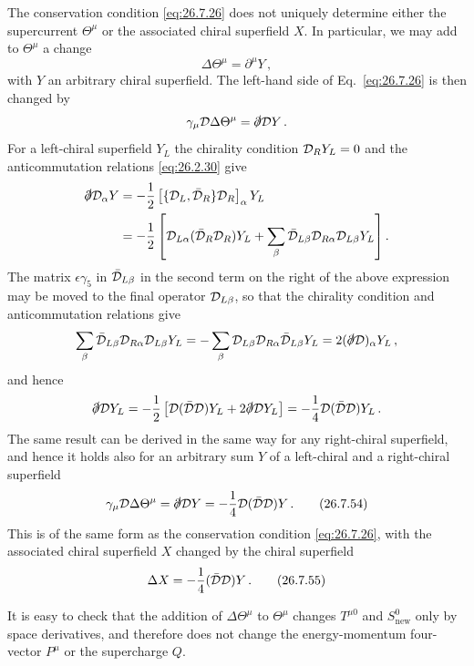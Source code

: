 The conservation condition \eqref{eq:26.7.26} does not uniquely determine
either the supercurrent \(\Theta^\mu\) or the associated chiral superfield
\(X\). In particular, we may add to \(\Theta^\mu\) a change
\begin{equation}
  \Delta\Theta^\mu=\partial^\mu Y\,,
  \tag{26.7.53}\label{eq:26.7.53}
\end{equation}
with \(Y\) an arbitrary chiral superfield. The left-hand side of
Eq.~\eqref{eq:26.7.26} is then changed by
\[
  \gamma_\mu\mathcal{D}\Delta\Theta^\mu
  =\slashed{\partial}\mathcal{D} Y\,.
\]
For a left-chiral superfield \(Y_L\) the chirality condition
\(\mathcal{D}_RY_L=0\) and the anticommutation relations \eqref{eq:26.2.30} give
\[
  \begin{aligned}
  \slashed{\partial}\mathcal{D}_\alpha Y
  &=-\frac12
    \left[\{\mathcal{D}_L,\bar{\mathcal{D}}_R\}\mathcal{D}_R\right]_\alpha Y_L
  \\
  &=-\frac12\left[
    \mathcal{D}_{L\alpha}(\bar{\mathcal{D}}_R\mathcal{D}_R)Y_L
    +\sum_\beta
      \bar{\mathcal{D}}_{L\beta}\mathcal{D}_{R\alpha}
      \mathcal{D}_{L\beta}Y_L
  \right].
  \end{aligned}
\]
The matrix \(\epsilon\gamma_5\) in \(\bar{\mathcal{D}}_{L\beta}\) in the second
term on the right of the above expression may be moved to the final operator
\(\mathcal{D}_{L\beta}\), so that the chirality condition and anticommutation
relations give
\[
  \sum_\beta
  \bar{\mathcal{D}}_{L\beta}\mathcal{D}_{R\alpha}\mathcal{D}_{L\beta}Y_L
  =-\sum_\beta
   \mathcal{D}_{L\beta}\mathcal{D}_{R\alpha}\bar{\mathcal{D}}_{L\beta}Y_L
  =2(\slashed{\partial}\mathcal{D})_\alpha Y_L\,,
\]
and hence
\[
  \slashed{\partial}\mathcal{D} Y_L
  =-\frac12\left[
    \mathcal{D}(\bar{\mathcal{D}}\mathcal{D})Y_L
    +2\slashed{\partial}\mathcal{D} Y_L
  \right]
  =-\frac14\mathcal{D}(\bar{\mathcal{D}}\mathcal{D})Y_L\,.
\]
The same result can be derived in the same way for any right-chiral
superfield, and hence it holds also for an arbitrary sum \(Y\) of a
left-chiral and a right-chiral superfield
\begin{equation}
  \gamma_\mu\mathcal{D}\Delta\Theta^\mu
  =\slashed{\partial}\mathcal{D} Y
  =-\frac14\mathcal{D}(\bar{\mathcal{D}}\mathcal{D})Y\,.
  \tag{26.7.54}\label{eq:26.7.54}
\end{equation}
This is of the same form as the conservation condition \eqref{eq:26.7.26},
with the associated chiral superfield \(X\) changed by the chiral superfield
\begin{equation}
  \Delta X=-\frac14(\bar{\mathcal{D}}\mathcal{D})Y\,.
  \tag{26.7.55}\label{eq:26.7.55}
\end{equation}

It is easy to check that the addition of \(\Delta\Theta^\mu\) to
\(\Theta^\mu\) changes \(T^{\mu0}\) and \(S_{\mathrm{new}}^0\) only by space
derivatives, and therefore does not change the energy-momentum four-vector
\(P^\mu\) or the supercharge \(Q\).

